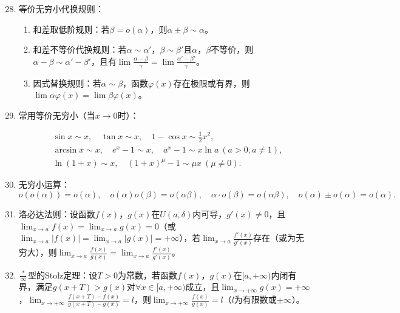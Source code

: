 \documentclass[UTF8]{ctexart}
\theoremstyle{remark}
\begin{document}
			
			\begin{enumerate}
				\setcounter{enumi}{27} %
				
				\item 等价无穷小代换规则：
				\begin{enumerate}
					\item 和差取低阶规则：若$\beta=o(\alpha)$，则$\alpha \pm \beta \sim \alpha$。
					\item 和差不等价代换规则：若$\alpha \sim \alpha'$，$\beta \sim \beta'$且$\alpha$，$\beta$不等价，则$\alpha-\beta \sim \alpha'-\beta'$，且有$\lim \frac{\alpha-\beta}{\gamma}=\lim \frac{\alpha'-\beta'}{\gamma}$。
					\item 因式替换规则：若$\alpha \sim \beta$，函数$\varphi(x)$存在极限或有界，则$\lim \alpha \varphi(x)=\lim \beta \varphi(x)$。
				\end{enumerate}
				
				\item 常用等价无穷小（当$x \to 0$时）：
				
				\begin{align*}
					&\sin x \sim x,\quad \tan x \sim x,\quad 1-\cos x \sim \frac{1}{2}x^2,\\
					&\arcsin x \sim x,\quad e^x-1 \sim x,\quad a^x-1 \sim x\ln a\ (a>0,a\neq1),\\
					&\ln(1+x) \sim x,\quad (1+x)^\mu -1 \sim \mu x\ (\mu\neq0).
				\end{align*}
				
				
				\item 无穷小运算：
				\[
				o(o(\alpha))=o(\alpha),\quad o(\alpha)o(\beta)=o(\alpha\beta),\quad \alpha \cdot o(\beta)=o(\alpha\beta),\quad o(\alpha) \pm o(\alpha)=o(\alpha).
				\]
				
				\item 洛必达法则：设函数$f(x)$，$g(x)$在$U(a,\delta)$内可导，$g'(x) \neq 0$，且$\lim_{x \to a} f(x)=\lim_{x \to a} g(x)=0$（或$\lim_{x \to a} |f(x)|=\lim_{x \to a} |g(x)|=+\infty$），若$\lim_{x \to a} \frac{f'(x)}{g'(x)}$存在（或为无穷大），则$\lim_{x \to a} \frac{f(x)}{g(x)}=\lim_{x \to a} \frac{f'(x)}{g'(x)}$。
				
				\item $\frac{*}{\infty}$型的Stolz定理：设$T>0$为常数，若函数$f(x)$，$g(x)$在$[a,+\infty)$内闭有界，满足$g(x+T)>g(x)$对$\forall x \in [a,+\infty)$成立，且$\lim_{x \to +\infty} g(x)=+\infty$，$\lim_{x \to +\infty} \frac{f(x+T)-f(x)}{g(x+T)-g(x)}=l$，则$\lim_{x \to +\infty} \frac{f(x)}{g(x)}=l$（$l$为有限数或$\pm\infty$）。
				

\end{enumerate}
\end{document}
